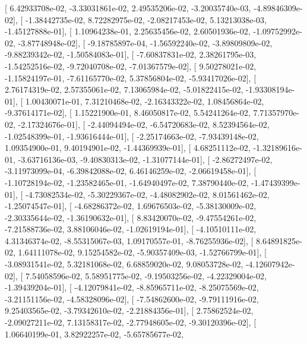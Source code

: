\documentclass{article}
\begin{document}
       [  6.42933708e-02,  -3.33031861e-02,   2.49535206e-02,
         -3.20035740e-03,  -4.89846309e-02],
       [ -1.38442735e-02,   8.72282975e-02,  -2.08217453e-02,
          5.13213038e-03,  -1.45127888e-01],
       [  1.10964238e-01,   2.25635456e-02,   2.60501936e-02,
         -1.09752992e-02,  -3.87748948e-02],
       [ -9.18785897e-04,  -1.56592240e-02,  -3.89809809e-02,
         -9.88239342e-02,  -1.50584083e-01],
       [ -7.60837831e-02,   2.38261795e-03,  -1.54252516e-02,
         -9.72040708e-02,  -7.01367579e-02],
       [  9.50278021e-02,  -1.15824197e-01,  -7.61165770e-02,
          5.37856804e-02,  -5.93417026e-02],
       [  2.76174319e-02,   2.57355061e-02,   7.13065984e-02,
         -5.01822415e-02,  -1.93308194e-01],
       [  1.00430071e-01,   7.31210468e-02,  -2.16343322e-02,
          1.08456864e-02,  -9.37614171e-02],
       [  1.15221900e-01,   8.46050817e-02,   5.54241264e-02,
          7.71357970e-02,  -2.17324676e-01],
       [ -2.44094494e-02,  -6.54720683e-02,   8.52394564e-02,
         -1.02548399e-01,  -1.93616444e-01],
       [ -2.25174663e-02,  -7.93439148e-02,   1.09354900e-01,
          9.40194901e-02,  -1.44369939e-01],
       [  4.68251112e-02,  -1.32189616e-01,  -3.63716136e-03,
         -9.40830313e-02,  -1.31077144e-01],
       [ -2.86272497e-02,  -3.11973099e-04,  -6.39842088e-02,
          6.46146259e-02,  -2.06619458e-01],
       [ -1.10728194e-02,  -1.23582465e-01,  -1.64940497e-02,
          7.38790440e-02,  -1.47439399e-01],
       [ -4.73082534e-02,  -5.30229367e-02,  -4.48082902e-02,
          8.01561462e-02,  -1.25074547e-01],
       [ -4.68286372e-02,   1.69676503e-02,  -5.38130009e-02,
         -2.30335644e-02,  -1.36190632e-01],
       [  8.83420070e-02,  -9.47554261e-02,  -7.21588736e-02,
          3.88106046e-02,  -1.02619194e-01],
       [ -4.10510111e-02,   4.31346374e-02,  -8.55315067e-03,
          1.09170557e-01,  -8.76255936e-02],
       [  8.64891825e-02,   1.64111078e-02,   9.15254582e-02,
         -5.90357409e-03,  -1.52766799e-01],
       [ -3.08931541e-02,   5.32181068e-02,   6.68859020e-02,
          9.08053728e-02,  -4.12607942e-02],
       [  7.54058596e-02,   5.58951775e-02,  -9.19503256e-02,
         -4.22329004e-02,  -1.39439204e-01],
       [ -4.12079841e-02,  -8.85965711e-02,  -8.25075569e-02,
         -3.21151156e-02,  -4.58328096e-02],
       [ -7.54862600e-02,  -9.79111916e-02,   9.25403565e-02,
         -3.79342610e-02,  -2.21884356e-01],
       [  2.75862524e-02,  -2.09027211e-02,   7.13158317e-02,
         -2.77948605e-02,  -9.30120396e-02],
       [  1.06640199e-01,   3.82922257e-02,  -5.65785677e-02,
\end{document}
